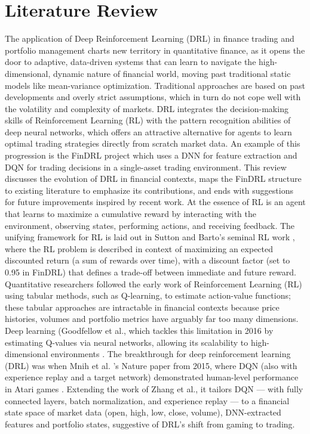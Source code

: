\section{Literature Review}
The application of Deep Reinforcement Learning (DRL) in finance trading and portfolio management charts new territory in quantitative finance, as it opens the door to adaptive, data-driven systems that can learn to navigate the high-dimensional, dynamic nature of financial world, moving past traditional static models like mean-variance optimization. Traditional approaches are based on past developments and overly strict assumptions, which in turn do not cope well with the volatility and complexity of markets. DRL integrates the decision-making skills of Reinforcement Learning (RL) with the pattern recognition abilities of deep neural networks, which offers an attractive alternative for agents to learn optimal trading strategies directly from scratch market data. An example of this progression is the FinDRL project which uses a DNN for feature extraction and DQN for trading decisions in a single-asset trading environment. This review discusses the evolution of DRL in financial contexts, maps the FinDRL structure to existing literature to emphasize its contributions, and ends with suggestions for future improvements inspired by recent work. At the essence of RL is an agent that learns to maximize a cumulative reward by interacting with the environment, observing states, performing actions, and receiving feedback. The unifying framework for RL is laid out in Sutton and Barto’s seminal RL work \cite{sutton_reinforcement_2018}, where the RL problem is described in context of maximizing an expected discounted return (a sum of rewards over time), with a discount factor (set to 0.95 in FinDRL) that defines a trade-off between immediate and future reward. Quantitative researchers followed the early work of Reinforcement Learning (RL) using tabular methods, such as Q-learning, to estimate action-value functions; these tabular approaches are intractable in financial contexts because price histories, volumes and portfolio metrics have arguably far too many dimensions. Deep learning (Goodfellow et al., which tackles this limitation in 2016 by estimating Q-values via neural networks, allowing its scalability to high-dimensional environments \cite{goodfellow_deeplearning_2016}. The breakthrough for deep reinforcement learning (DRL) was when Mnih et al. 's Nature paper from 2015, where DQN (also with experience replay and a target network) demonstrated human-level performance in Atari games \cite{mnih_dqn_2015}. Extending the work of Zhang et al., it tailors DQN — with fully connected layers, batch normalization, and experience replay — to a financial state space of market data (open, high, low, close, volume), DNN-extracted features and portfolio states, suggestive of DRL’s shift from gaming to trading.

